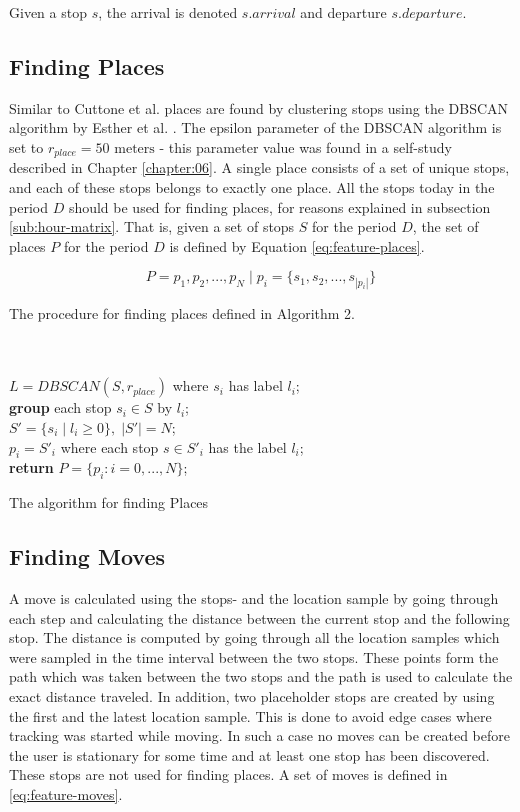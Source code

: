 Given a stop $s$, the arrival is denoted $s.arrival$ and departure $s.departure$.

\subsection{Finding Places}
Similar to Cuttone et al. places are found by clustering stops using the DBSCAN algorithm by Esther et al. \cite{density-based-1996}. The epsilon parameter of the DBSCAN algorithm is set to $r_{place} = 50 \text{ meters}$ - this parameter value was found in a self-study described in Chapter \ref{chapter:06}. A single place consists of a set of unique stops, and each of these stops belongs to exactly one place. All the stops today in the period $D$ should be used for finding places, for reasons explained in subsection \ref{sub:hour-matrix}. That is, given a set of stops $S$ for the period $D$, the set of places $P$ for the period $D$ is defined by Equation \eqref{eq:feature-places}. 

\begin{equation}
\label{eq:feature-places}
P = {p_1, p_2, ..., p_N} \;|\; p_i = \{s_1, s_2, ..., s_{|p_i|}\}
\end{equation}

 
The procedure for finding places defined in Algorithm 2.

\begin{algorithm}[H]
\SetAlgoLined
{}\\
\\
    $L = DBSCAN(S, r_{place})$ where $s_i$ has label $l_i$;\\
    \textbf{group} each stop $s_i \in S$ by $l_i$;\\
    $S' = \{s_i \;|\; l_i \geq 0\}, \;|S'| = N$;\\
    $p_i = S'_i$ where each stop $s \in S'_i$ has the label $l_i$;\\
    \textbf{return} $P = \{p_i : i = 0, ..., N\}$;\\
 \label{algo:places}
 \caption{The algorithm for finding Places}
\end{algorithm}

\subsection{Finding Moves}
A move is calculated using the stops- and the location sample by going through each step and calculating the distance between the current stop and the following stop. The distance is computed by going through all the location samples which were sampled in the time interval between the two stops. These points form the path which was taken between the two stops and the path is used to calculate the exact distance traveled. In addition, two placeholder stops are created by using the first and the latest location sample. This is done to avoid edge cases where tracking was started while moving. In such a case no moves can be created before the user is stationary for some time and at least one stop has been discovered. These stops are not used for finding places. A set of moves is defined in \eqref{eq:feature-moves}.

